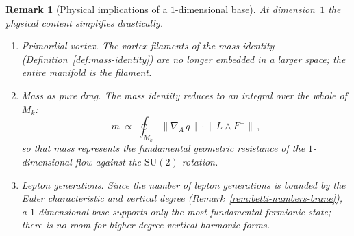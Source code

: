 \documentclass[12pt,a4paper]{report}
\newtheorem{remark}[theorem]{Remark}
\begin{document}
\begin{remark}[Physical implications of a $1$-dimensional base]
\label{rem:descent-physical}
At dimension~$1$ the physical content simplifies drastically.
\begin{enumerate}
  \item \emph{Primordial vortex.}  The vortex filaments of the mass identity
        (Definition~\ref{def:mass-identity}) are no longer embedded in a larger
        space; the entire manifold \emph{is} the filament.
  \item \emph{Mass as pure drag.}  The mass identity reduces to an integral
        over the whole of $M_k$:
        \[
          m \;\propto\; \oint_{M_k} \lVert \nabla_A\, q \rVert
                       \cdot \lVert L \wedge F^+ \rVert\,,
        \]
        so that mass represents the fundamental geometric resistance of the
        $1$-dimensional flow against the $\mathrm{SU}(2)$ rotation.
  \item \emph{Lepton generations.}  Since the number of lepton generations is
        bounded by the Euler characteristic and vertical degree
        (Remark~\ref{rem:betti-numbers-brane}), a $1$-dimensional base supports
        only the most fundamental fermionic state; there is no room for
        higher-degree vertical harmonic forms.
\end{enumerate}
\end{remark}
\end{document}
